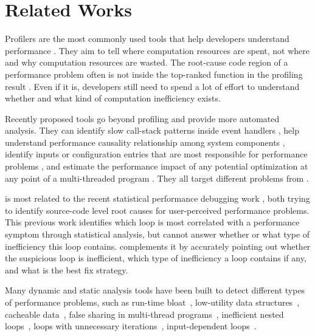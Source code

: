 \section{Related Works}
\label{sec:related}

Profilers are the most commonly used tools that help developers understand
performance
\cite{Zaparanuks:2012:AP:2254064.2254074,Coppa:2012:IP:2254064.2254076,
D'Elia:2011:MHC:1993498.1993559, 
Mytkowicz:2010:EAJ:1806596.1806618,
Ravindranath:2012:AMA:2387880.2387891,
Jovic:2011:CMY:2048066.2048081,IntroPerf}.
They aim to tell where 
computation resources are spent, 
not where and why computation resources are wasted. 
The root-cause code region of a performance problem often is not inside
the top-ranked function in the profiling result \cite{SongOOPSLA2014}.
Even if it is, developers still need to spend a lot of effort to understand
whether and what kind of computation inefficiency exists.

Recently proposed tools go beyond profiling and provide more automated analysis.
They can identify slow call-stack patterns inside event handlers
\cite{Han:2012:PDL:2337223.2337241}, help understand performance causality
relationship among system components
\cite{TaoAsplos2014}, identify inputs 
or configuration entries that are most responsible for performance problems
\cite{Attariyan:2012:XAR:2387880.2387910},
and estimate the performance impact of any
potential optimization at any point of a multi-threaded program
\cite{coz.sosp15}. 
They all target different problems from \Tool. 

\Tool is most related to
the recent statistical performance debugging work
\citep{SongOOPSLA2014}, both trying to identify source-code level root causes
for user-perceived performance problems. 
This previous work identifies which loop is most correlated with 
a performance symptom through statistical analysis, 
but cannot answer whether or 
what type of inefficiency this loop contains.
\Tool complements it by
accurately pointing out whether the suspicious loop is inefficient,
which type of inefficiency a loop contains if any, and 
what is the best fix strategy.

Many dynamic and static analysis tools have been built to detect different
types of performance problems, such as 
run-time bloat~\cite{Dufour:2008:STC:1453101.1453111, Xu:2009:GFP:1542476.1542523, Xu:2010:DIC:1806596.1806616}, 
low-utility data structures~\cite{Xu:2010:FLD:1806596.1806617}, 
cacheable data~\cite{Cachetor}, false sharing in
multi-thread programs~\cite{Liu:2011:SPD:2048066.2048070},
inefficient nested loops~\cite{Alabama},
loops with unnecessary iterations~\cite{CARAMEL,IsilDillig.PLDI15},
input-dependent loops~\cite{xiao13:context}. 

